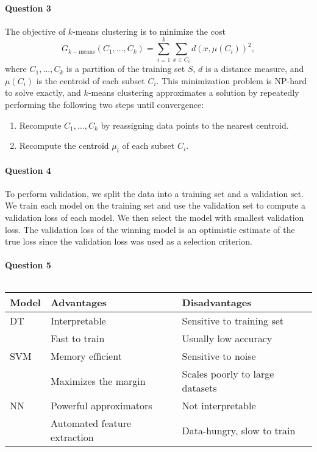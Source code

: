\documentclass{article}
\begin{document}
\paragraph{Question 3}
The objective of $k$-means clustering is to minimize the cost
\[G_{k-\text{means}}(C_1,\ldots,C_k) = \sum_{i=1}^k\sum_{x\in C_i} d(x,\mu(C_i))^2,\]
where $C_1,\ldots,C_k$ is a partition of the training set $S$, $d$ is a distance measure, and $\mu(C_i)$ is the centroid of each subset $C_i$. This minimization problem is NP-hard to solve exactly, and $k$-means clustering approximates a solution by repeatedly performing the following two steps until convergence:
\begin{enumerate}
  \item Recompute $C_1,\ldots,C_k$ by reassigning data points to the nearest centroid.
  \item Recompute the centroid $\mu_i$ of each subset $C_i$.
\end{enumerate}

\paragraph{Question 4}
To perform validation, we split the data into a training set and a validation set. We train each model on the training set and use the validation set to compute a validation loss of each model. We then select the model with smallest validation loss. The validation loss of the winning model is an optimistic estimate of the true loss since the validation loss was used as a selection criterion.

\paragraph{Question 5} $\;$\\

\begin{tabular}{lll}
{\bf Model} & {\bf Advantages} & {\bf Disadvantages}\\
\hline
DT & Interpretable & Sensitive to training set\\
   & Fast to train & Usually low accuracy\\
\hline
SVM & Memory efficient & Sensitive to noise\\
    & Maximizes the margin & Scales poorly to large datasets\\
\hline
NN & Powerful approximators & Not interpretable\\
   & Automated feature extraction & Data-hungry, slow to train\\
\end{tabular}
\end{document}
